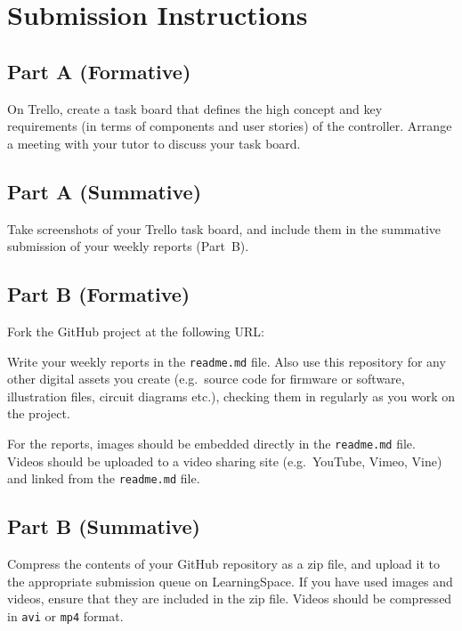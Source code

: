 \documentclass{../fal_assignment}
\begin{document}
\section*{Submission Instructions}

\subsection*{Part A (Formative)}

On Trello, create a task board that defines the high concept and key requirements (in terms of components and user stories) of the controller. Arrange a meeting with your tutor to discuss your task board.

\subsection*{Part A (Summative)}

Take screenshots of your Trello task board, and include them in the summative submission
of your weekly reports (Part~B).

\subsection*{Part B (Formative)}

Fork the GitHub project at the following URL:


Write your weekly reports in the \texttt{readme.md} file.
Also use this repository for any other digital assets you create
(e.g.\ source code for firmware or software, illustration files, circuit diagrams etc.),
checking them in regularly as you work on the project.

For the reports, images should be embedded directly in the \texttt{readme.md} file.
Videos should be uploaded to a video sharing site (e.g.\ YouTube, Vimeo, Vine)
and linked from the \texttt{readme.md} file.

\subsection*{Part B (Summative)}

Compress the contents of your GitHub repository as a zip file,
and upload it to the appropriate submission queue on LearningSpace.
If you have used images and videos, ensure that they are included in the zip file.
Videos should be compressed in \texttt{avi} or \texttt{mp4} format.
\end{document}
